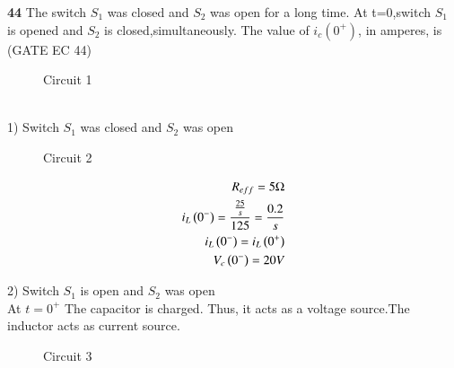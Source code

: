 \documentclass[journal,12pt,twocolumn]{IEEEtran}
\begin{document}


\vspace{3cm}

\title{}
\author{EE23BTECH11047 - Deepakreddy P
}
\maketitle
\newpage
\bigskip

\noindent \textbf{44} \quad The switch $S_1$ was closed and $S_2$ was open for a long time. At t=0,switch $S_1$ is opened and $S_2$ is closed,simultaneously. The value of $i_c(0^{+})$, in amperes, is  \hfill (GATE EC 44)

\begin{figure}[ht]
  \centering
  \begin{adjustbox}{width=\columnwidth}
      
  \end{adjustbox}
  \caption{Circuit 1}
\end{figure}

\solution
\\
1) Switch $S_1$ was closed and $S_2$ was open 
\begin{figure}[ht]
  \centering
  \begin{adjustbox}{width=\columnwidth}
      
  \end{adjustbox}
  \caption{Circuit 2}
\end{figure}

\begin{align}
    R_{eff} = 5 \Omega \\
    i_{L} \left(0^-\right) = \frac{\frac{25}{s}}{125}  = \frac{0.2}{s}\\
    i_{L} \left(0^-\right) = i_{L} \left(0^+\right)\\
    V_c \left(0^-\right) = 20V
\end{align}

\bigskip

2) Switch $S_1$ is open and $S_2$ was open\\

At $t=0^{+}$ The capacitor is charged. Thus, it acts as a voltage source.The inductor acts as current source.\\

\bigskip

\begin{figure}[ht]
  \centering
  \begin{adjustbox}{width=\columnwidth}
      
  \end{adjustbox}
  \caption{Circuit 3}
\end{figure}
\end{document}
